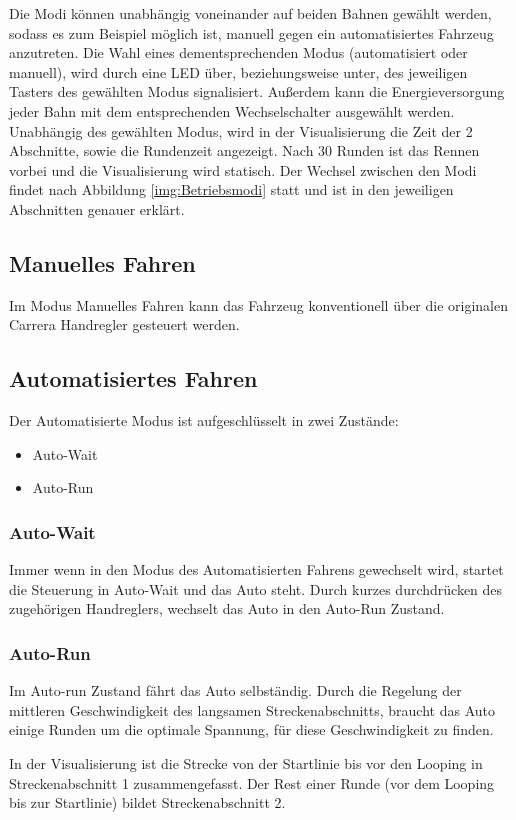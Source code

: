 \documentclass[a4paper, 11pt]{report}
\begin{document}
	Die Modi können unabhängig voneinander auf beiden Bahnen gewählt werden, sodass es zum Beispiel möglich ist, manuell gegen ein automatisiertes Fahrzeug anzutreten. Die Wahl eines dementsprechenden Modus (automatisiert oder manuell), wird durch eine LED über, beziehungsweise unter, des jeweiligen Tasters des gewählten Modus signalisiert. Außerdem kann die Energieversorgung jeder Bahn mit dem entsprechenden Wechselschalter ausgewählt werden. Unabhängig des gewählten Modus, wird in der Visualisierung die Zeit der 2 Abschnitte, sowie die Rundenzeit angezeigt. Nach 30 Runden ist das Rennen vorbei und die Visualisierung wird statisch.
	Der Wechsel zwischen den Modi findet nach Abbildung \ref{img:Betriebsmodi} statt und ist in den jeweiligen Abschnitten genauer erklärt.
	\subsection{Manuelles Fahren}\label{subsec:ManuellesFahren}
		Im Modus Manuelles Fahren kann das Fahrzeug konventionell über die originalen Carrera Handregler gesteuert
		werden.
\newpage
	\subsection{Automatisiertes Fahren}
		Der Automatisierte Modus ist aufgeschlüsselt in zwei Zustände:
		\begin{itemize}
			\item Auto-Wait
			\item Auto-Run
		\end{itemize}
		\subsubsection{Auto-Wait}
		Immer wenn in den Modus des Automatisierten Fahrens gewechselt wird, startet die Steuerung in
		Auto-Wait und das Auto steht.
		Durch kurzes durchdrücken des zugehörigen Handreglers, wechselt das Auto in den Auto-Run Zustand.
		\subsubsection{Auto-Run}
			Im Auto-run Zustand fährt das Auto selbständig. Durch die Regelung der mittleren Geschwindigkeit des langsamen Streckenabschnitts, braucht das Auto einige Runden um die optimale Spannung, für diese Geschwindigkeit zu finden.

			In der Visualisierung ist die Strecke von der Startlinie bis vor den Looping in Streckenabschnitt 1 zusammengefasst.
			Der Rest einer Runde (vor dem Looping bis zur Startlinie) bildet Streckenabschnitt 2.
\end{document}
